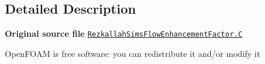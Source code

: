 \subsection{Detailed Description}
{\bfseries Original source file} \href{../../../home/carlo/data/GeN-Foam/GeN-Foam_ffn/GeN-Foam/GeN-Foam/classes/thermalHydraulics/src/physicsModels/heatTransferModels/FSHeatTransferCoefficientModels/subModels/flowEnhancementFactorModels/RezkallahSims/RezkallahSimsFlowEnhancementFactor.C}{\tt Rezkallah\+Sims\+Flow\+Enhancement\+Factor.\+C}

Open\+F\+O\+AM is free software\+: you can redistribute it and/or modify it 